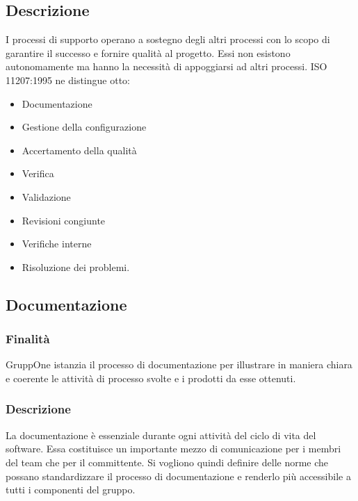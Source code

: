 \documentclass[../norme-di-progetto.tex]{subfiles}
\begin{document}
\subsection{Descrizione}%
\label{sub:processi_di_supporto/descrizione}

I processi di supporto operano a sostegno degli altri processi con lo scopo di garantire il successo e fornire qualità al progetto.
Essi non esistono autonomamente ma hanno la necessità di appoggiarsi ad altri processi.
ISO 11207:1995 ne distingue otto:

\begin{itemize}
  \item Documentazione
  \item Gestione della configurazione
  \item Accertamento della qualità
  \item Verifica
  \item Validazione
  \item Revisioni congiunte
  \item Verifiche interne
  \item Risoluzione dei problemi.
\end{itemize}

\subsection{Documentazione}%
\label{sub:documentazione}

\subsubsection{Finalità}%
\label{subs:documentazione/finalita}

GruppOne istanzia il processo di documentazione per illustrare in maniera chiara e coerente le attività di processo svolte e i prodotti da esse ottenuti.

\subsubsection{Descrizione}%
\label{subs:documentazione/descrizione}

La documentazione è essenziale durante ogni attività del ciclo di vita del software.
Essa costituisce un importante mezzo di comunicazione per i membri del team che per il committente.
Si vogliono quindi definire delle norme che possano standardizzare il processo di documentazione e renderlo più accessibile a tutti i componenti del gruppo.
\end{document}
